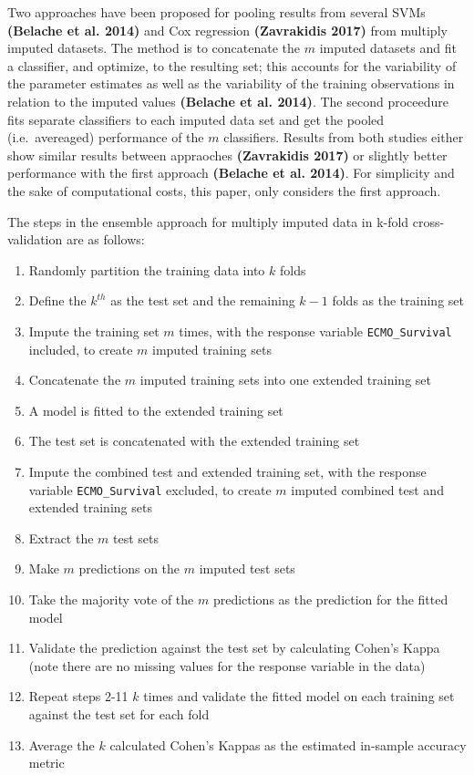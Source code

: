 \documentclass[12pt,]{article}
\providecommand{\tightlist}{%
  \setlength{\itemsep}{0pt}\setlength{\parskip}{0pt}}
\begin{document}
Two approaches have been proposed for pooling results from several SVMs
\textbf{(Belache et al. 2014)} and Cox regression \textbf{(Zavrakidis
2017)} from multiply imputed datasets. The method is to concatenate the
\(m\) imputed datasets and fit a classifier, and optimize, to the
resulting set; this accounts for the variability of the parameter
estimates as well as the variability of the training observations in
relation to the imputed values \textbf{(Belache et al. 2014)}. The
second proceedure fits separate classifiers to each imputed data set and
get the pooled (i.e.~avereaged) performance of the \(m\) classifiers.
Results from both studies either show similar results between appraoches
\textbf{(Zavrakidis 2017)} or slightly better performance with the first
approach \textbf{(Belache et al. 2014)}. For simplicity and the sake of
computational costs, this paper, only considers the first approach.

The steps in the ensemble approach for multiply imputed data in k-fold
cross-validation are as follows:

\begin{enumerate}
\def\labelenumi{\arabic{enumi}.}
\tightlist
\item
  Randomly partition the training data into \(k\) folds
\item
  Define the \(k^{th}\) as the test set and the remaining \(k-1\) folds
  as the training set
\item
  Impute the training set \(m\) times, with the response variable
  \texttt{ECMO\_Survival} included, to create \(m\) imputed training
  sets
\item
  Concatenate the \(m\) imputed training sets into one extended training
  set
\item
  A model is fitted to the extended training set
\item
  The test set is concatenated with the extended training set
\item
  Impute the combined test and extended training set, with the response
  variable \texttt{ECMO\_Survival} excluded, to create \(m\) imputed
  combined test and extended training sets
\item
  Extract the \(m\) test sets
\item
  Make \(m\) predictions on the \(m\) imputed test sets
\item
  Take the majority vote of the \(m\) predictions as the prediction for
  the fitted model
\item
  Validate the prediction against the test set by calculating Cohen's
  Kappa (note there are no missing values for the response variable in
  the data)
\item
  Repeat steps 2-11 \(k\) times and validate the fitted model on each
  training set against the test set for each fold
\item
  Average the \(k\) calculated Cohen's Kappas as the estimated in-sample
  accuracy metric
\end{enumerate}
\end{document}
